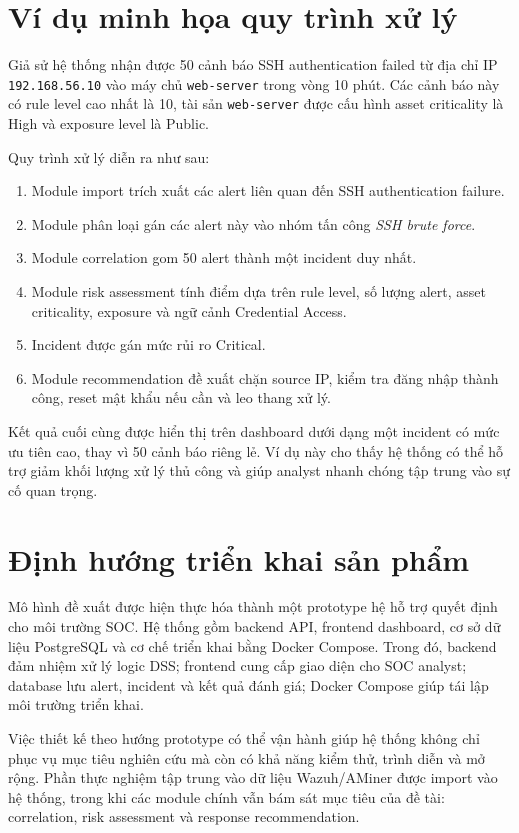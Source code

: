 \documentclass[a4paper,12pt,oneside]{book}
\begin{document}
\section{Ví dụ minh họa quy trình xử lý}
{\fontsize{13pt}{15.6pt}\selectfont

Giả sử hệ thống nhận được 50 cảnh báo SSH authentication failed từ địa chỉ IP \texttt{192.168.56.10} vào máy chủ \texttt{web-server} trong vòng 10 phút. Các cảnh báo này có rule level cao nhất là 10, tài sản \texttt{web-server} được cấu hình asset criticality là High và exposure level là Public.

\noindent Quy trình xử lý diễn ra như sau:

\begin{enumerate}
    \item Module import trích xuất các alert liên quan đến SSH authentication failure.
    \item Module phân loại gán các alert này vào nhóm tấn công \textit{SSH brute force}.
    \item Module correlation gom 50 alert thành một incident duy nhất.
    \item Module risk assessment tính điểm dựa trên rule level, số lượng alert, asset criticality, exposure và ngữ cảnh Credential Access.
    \item Incident được gán mức rủi ro Critical.
    \item Module recommendation đề xuất chặn source IP, kiểm tra đăng nhập thành công, reset mật khẩu nếu cần và leo thang xử lý.
\end{enumerate}

\noindent Kết quả cuối cùng được hiển thị trên dashboard dưới dạng một incident có mức ưu tiên cao, thay vì 50 cảnh báo riêng lẻ. Ví dụ này cho thấy hệ thống có thể hỗ trợ giảm khối lượng xử lý thủ công và giúp analyst nhanh chóng tập trung vào sự cố quan trọng.

}

\section{Định hướng triển khai sản phẩm}
{\fontsize{13pt}{15.6pt}\selectfont

Mô hình đề xuất được hiện thực hóa thành một prototype hệ hỗ trợ quyết định cho môi trường SOC. Hệ thống gồm backend API, frontend dashboard, cơ sở dữ liệu PostgreSQL và cơ chế triển khai bằng Docker Compose. Trong đó, backend đảm nhiệm xử lý logic DSS; frontend cung cấp giao diện cho SOC analyst; database lưu alert, incident và kết quả đánh giá; Docker Compose giúp tái lập môi trường triển khai.

\noindent Việc thiết kế theo hướng prototype có thể vận hành giúp hệ thống không chỉ phục vụ mục tiêu nghiên cứu mà còn có khả năng kiểm thử, trình diễn và mở rộng. Phần thực nghiệm tập trung vào dữ liệu Wazuh/AMiner được import vào hệ thống, trong khi các module chính vẫn bám sát mục tiêu của đề tài: correlation, risk assessment và response recommendation.

}
\end{document}
